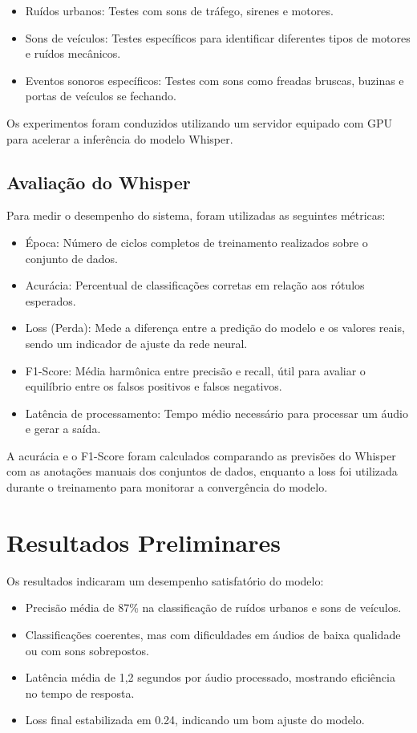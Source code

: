 \documentclass[conference]{IEEEtran}
\begin{document}
\begin{itemize}
\item Ruídos urbanos: Testes com sons de tráfego, sirenes e motores.
\item Sons de veículos: Testes específicos para identificar diferentes tipos de motores e ruídos mecânicos.
\item Eventos sonoros específicos: Testes com sons como freadas bruscas, buzinas e portas de veículos se fechando.
\end{itemize}

Os experimentos foram conduzidos utilizando um servidor equipado com GPU para acelerar a inferência do modelo Whisper.

\subsection{Avaliação do Whisper}
Para medir o desempenho do sistema, foram utilizadas as seguintes métricas:

\begin{itemize}
\item Época: Número de ciclos completos de treinamento realizados sobre o conjunto de dados.
\item Acurácia: Percentual de classificações corretas em relação aos rótulos esperados.
\item Loss (Perda): Mede a diferença entre a predição do modelo e os valores reais, sendo um indicador de ajuste da rede neural.
\item F1-Score: Média harmônica entre precisão e recall, útil para avaliar o equilíbrio entre os falsos positivos e falsos negativos.
\item Latência de processamento: Tempo médio necessário para processar um áudio e gerar a saída.
\end{itemize}

A acurácia e o F1-Score foram calculados comparando as previsões do Whisper com as anotações manuais dos conjuntos de dados, enquanto a loss foi utilizada durante o treinamento para monitorar a convergência do modelo.

\section{Resultados Preliminares}
Os resultados indicaram um desempenho satisfatório do modelo:

\begin{itemize}
\item Precisão média de 87\% na classificação de ruídos urbanos e sons de veículos.
\item Classificações coerentes, mas com dificuldades em áudios de baixa qualidade ou com sons sobrepostos.
\item Latência média de 1,2 segundos por áudio processado, mostrando eficiência no tempo de resposta.
\item Loss final estabilizada em 0.24, indicando um bom ajuste do modelo.
\end{itemize}
\end{document}
